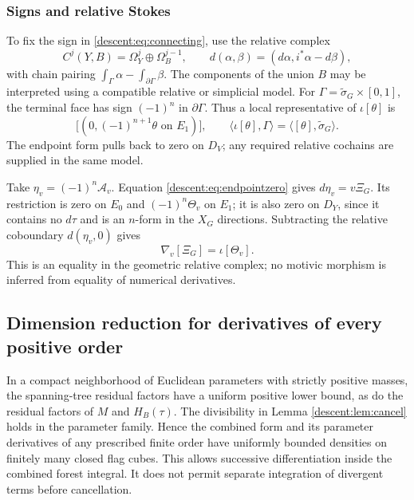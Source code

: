 \documentclass[11pt,a4paper,oneside]{article}
\theoremstyle{plain}
\theoremstyle{definition}
\theoremstyle{remark}
\numberwithin{equation}{section}
\begin{document}
\subsubsection{Signs and relative Stokes}
To fix the sign in \eqref{descent:eq:connecting}, use the relative complex
\[
 C^j(Y,B)=\Omega_Y^j\oplus\Omega_B^{j-1},\qquad
 d(\alpha,\beta)=(d\alpha,i^*\alpha-d\beta),
\]
with chain pairing $\int_\Gamma\alpha-\int_{\partial\Gamma}\beta$.
The components of the union $B$ may be interpreted using a compatible relative or simplicial model.
For $\Gamma=\widetilde\sigma_G\times[0,1]$, the terminal face has sign $(-1)^n$ in $\partial\Gamma$.
Thus a local representative of $\iota[\theta]$ is
\begin{equation}\label{descent:eq:cone}
 \bigl[(0,(-1)^{n+1}\theta\text{ on }E_1)\bigr],
 \qquad
 \langle\iota[\theta],\Gamma\rangle
     =\langle[\theta],\widetilde\sigma_G\rangle.
\end{equation}
The endpoint form pulls back to zero on $D_V$; any required relative cochains are supplied in the same model.

Take $\eta_v=(-1)^n\mathcal A_v$.
Equation \eqref{descent:eq:endpointzero} gives $d\eta_v=v\Xi_G$.
Its restriction is zero on $E_0$ and $(-1)^n\Theta_v$ on $E_1$; it is also zero on $D_Y$, since it contains no $d\tau$ and is an $n$-form in the $X_G$ directions.
Subtracting the relative coboundary $d(\eta_v,0)$ gives
\begin{equation}\label{descent:eq:GM}
 \nabla_v[\Xi_G]=\iota[\Theta_v].
\end{equation}
This is an equality in the geometric relative complex; no motivic morphism is inferred from equality of numerical derivatives.


\subsection{Dimension reduction for derivatives of every positive order}
In a compact neighborhood of Euclidean parameters with strictly positive masses, the spanning-tree residual factors have a uniform positive lower bound, as do the residual factors of $M$ and $H_B(\tau)$.
The divisibility in Lemma \ref{descent:lem:cancel} holds in the parameter family.
Hence the combined form and its parameter derivatives of any prescribed finite order have uniformly bounded densities on finitely many closed flag cubes.
This allows successive differentiation inside the combined forest integral.
It does not permit separate integration of divergent terms before cancellation.
\end{document}
